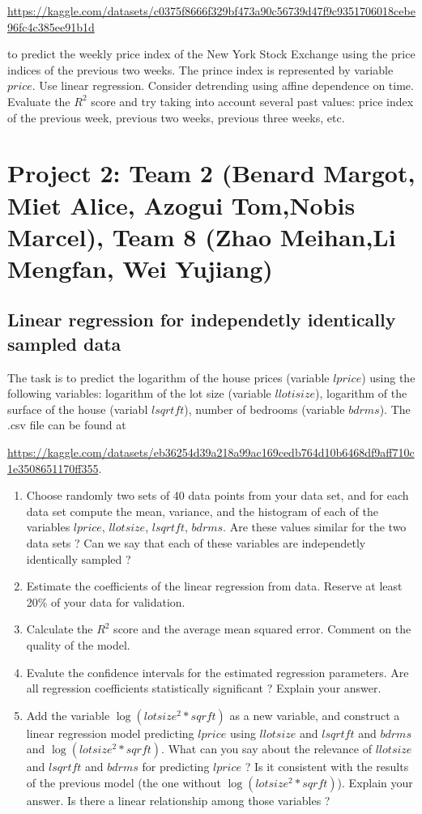 \documentclass{article}
\begin{document}
    \url{https://kaggle.com/datasets/c0375f8666f329bf473a90c56739d47f9c9351706018cebe96fc4c385ee91b1d} 

    to predict the weekly 
   price index of the New York Stock Exchange using the price indices of the previous two weeks. The prince index is represented by
   variable $price$. Use linear regression. Consider detrending using affine dependence on time.  
   Evaluate the $R^2$ score and try taking into account several past values: price index of
   the previous week, previous two weeks, previous three weeks, etc. 


\section*{Project 2:  Team 2 (Benard Margot, Miet Alice, Azogui Tom,Nobis Marcel), Team 8  (Zhao Meihan,Li Mengfan, Wei Yujiang)}


 \subsection*{Linear regression for independetly identically sampled data}
  The task is to predict the logarithm of the house prices (variable $lprice$) using the following variables:
  logarithm of the lot size (variable $llotisize$), logarithm of the surface of the house (variabl $lsqrtft$), number of bedrooms (variable $bdrms$). 	
   The .csv file can be found at 

   \url{https://kaggle.com/datasets/eb36254d39a218a99ac169cedb764d10b6468df9aff710c1e3508651170ff355}. %

  \begin{enumerate}
   \item Choose randomly two sets of 40 data points from your data set, and for each data set compute the mean, variance, and the histogram
	of each of the variables  $lprice$, $llotsize$, $lsqrtft$,  $bdrms$. 
	Are these values similar for the two data sets ?  Can we say that each of these variables are independetly identically sampled ? 

  \item Estimate the coefficients of the linear regression from data. Reserve at least 20\% of your data for validation.
  \item Calculate the $R^2$ score and the average mean squared error. Comment on the quality of the model.
  \item Evalute the confidence intervals for the estimated regression parameters. Are all regression coefficients statistically significant ? Explain your answer. 
  \item Add the variable $\log(lotsize^2*sqrft)$ as a new variable, and construct a linear regression model predicting $lprice$ using
	 $llotsize$ and $lsqrtft$ and $bdrms$ and $\log(lotsize^2*sqrft)$. What can you say about the relevance of  $llotsize$ and $lsqrtft$ and $bdrms$
		  for predicting $lprice$ ? Is it consistent with the results of the previous model (the one without $\log(lotsize^2*sqrft)$).
		  Explain your answer. Is there a linear relationship among those variables ? 

  \end{enumerate}
 
\end{document}
